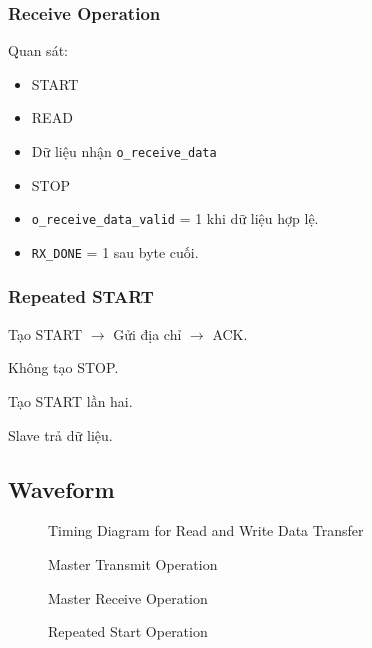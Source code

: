 \subsubsection{Receive Operation}
Quan sát:
\begin{itemize}[leftmargin=1.2cm]
    \item START
    \item READ
    \item Dữ liệu nhận \texttt{o\_receive\_data}
    \item STOP
\end{itemize}

\begin{itemize}[leftmargin=1.2cm]
    \item \texttt{o\_receive\_data\_valid} = 1 khi dữ liệu hợp lệ.
    \item \texttt{RX\_DONE} = 1 sau byte cuối.
\end{itemize}

\subsubsection{Repeated START}
Tạo START $\rightarrow$ Gửi địa chỉ $\rightarrow$ ACK.

Không tạo STOP.

Tạo START lần hai.

Slave trả dữ liệu.

\subsection{Waveform}

\begin{figure}[H]
    \centering
    \caption{Timing Diagram for Read and Write Data Transfer}
    \label{fig:w5}
\end{figure}

\begin{figure}[H]
    \centering
    \caption{Master Transmit Operation}
    \label{fig:w6}
\end{figure}

\begin{figure}[H]
    \centering
    \caption{Master Receive Operation}
    \label{fig:w7}
\end{figure}

\begin{figure}[H]
    \centering
    \caption{Repeated Start Operation}
    \label{fig:w8}
\end{figure}
